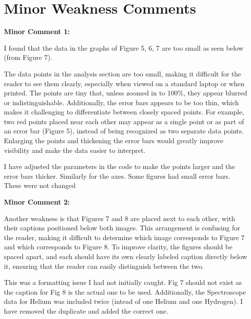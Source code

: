 \documentclass[%
 aip,
cp,  %
 amsmath,amssymb,
 reprint,%
]{revtex4-2}
\begin{document}
        \section{Minor Weakness Comments}
        \begin{mdframed} \textbf{Minor Comment 1:}

            I found that the data in the graphs of Figure 5, 6, 7 are too small as seen below (from Figure 7).

            The data points in the analysis section are too small, making it difficult for the reader to see them clearly, especially when viewed on a standard laptop or when printed. The points are tiny that, unless zoomed in to 100\%, they appear blurred or indistinguishable. Additionally, the error bars appears to be too thin, which makes it challenging to differentiate between closely spaced points. For example, two red points placed near each other may appear as a single point or as part of an error bar (Figure 5), instead of being recognized as two separate data points. Enlarging the points and thickening the error bars would greatly improve visibility and make the data easier to interpret.
        \end{mdframed}
        {\color{red}

            I have adjusted the parameters in the code to make the points larger and the error bars thicker. Similarly for the axes. Some figures had small error bars. These were not changed

        }
        \begin{mdframed} \textbf{Minor Comment 2:}

            Another weakness is that Figures 7 and 8 are placed next to each other, with their captions positioned below both images. This arrangement is confusing for the reader, making it difficult to determine which image corresponds to Figure 7 and which corresponds to Figure 8. To improve clarity, the figures should be spaced apart, and each should have its own clearly labeled caption directly below it, ensuring that the reader can easily distinguish between the two.
        \end{mdframed}
        {\color{red}
        
            This was a formatting issue I had not initially caught. Fig 7 should not exist as the caption for Fig 8 is the actual one to be used. Additionally, the Spectroscope data for Helium was included twice (intead of one Helium and one Hydrogen). I have removed the duplicate and added the correct one.

        }
\end{document}
